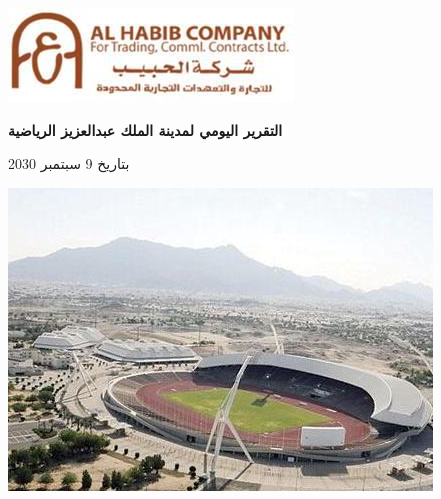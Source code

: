 \documentclass{article}
\begin{document}
\setRL
\renewcommand{\figurename}{الشكل}

\pagestyle{plain}

\begin{titlepage}
    \centering
    \includegraphics[width=1 \textwidth]{logo.jpg}

    \vspace{1cm}
    {\Huge \textbf{التقرير اليومي لمدينة الملك عبدالعزيز الرياضية}}

    \vspace{0.5cm}
    {\Large بتاريخ} 
    {\Large 9 سبتمبر 2030}

    \vspace{1cm}
    \includegraphics[width=\textwidth]{stad.jpg}
\end{titlepage}
\newpage
\renewcommand{\contentsname}{فهرس المحتويات}
\newpage
\tableofcontents
\newpage
\end{document}

